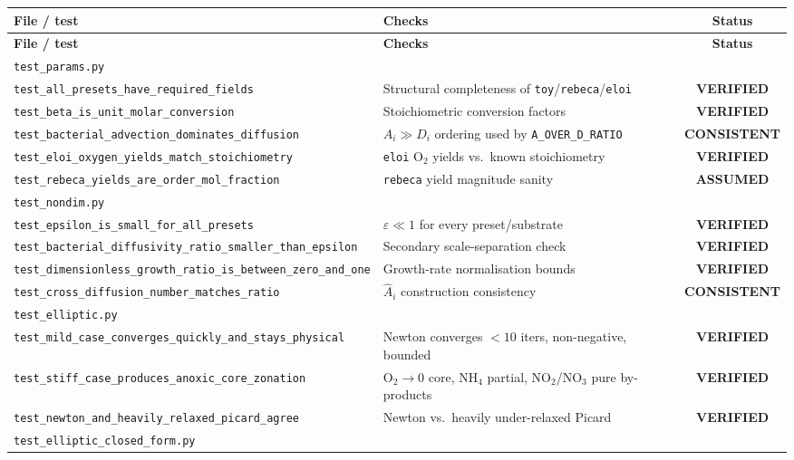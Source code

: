 \documentclass[11pt]{article}
\newcommand{\verified}{\textcolor{green!45!black}{\textbf{VERIFIED}}}
\newcommand{\consistent}{\textcolor{blue!55!black}{\textbf{CONSISTENT}}}
\newcommand{\assumed}{\textcolor{orange!70!black}{\textbf{ASSUMED}}}
\newcommand{\code}[1]{\texttt{#1}}
\newcommand{\test}[1]{\texttt{\small #1}}
\begin{document}
\begin{longtable}{p{3.6cm}p{9.4cm}c}
\toprule
\textbf{File / test} & \textbf{Checks} & \textbf{Status}\\
\midrule
\endfirsthead
\toprule
\textbf{File / test} & \textbf{Checks} & \textbf{Status}\\
\midrule
\endhead
\multicolumn{3}{l}{\code{test\_params.py}} \\
\test{test\_all\_presets\_have\_required\_fields} & Structural completeness of \code{toy}/\code{rebeca}/\code{eloi} & \verified \\
\test{test\_beta\_is\_unit\_molar\_conversion} & Stoichiometric conversion factors & \verified \\
\test{test\_bacterial\_advection\_dominates\_diffusion} & $A_i \gg D_i$ ordering used by \code{A\_OVER\_D\_RATIO} & \consistent \\
\test{test\_eloi\_oxygen\_yields\_match\_stoichiometry} & \code{eloi} O$_2$ yields vs.\ known stoichiometry & \verified \\
\test{test\_rebeca\_yields\_are\_order\_mol\_fraction} & \code{rebeca} yield magnitude sanity & \assumed \\
\midrule
\multicolumn{3}{l}{\code{test\_nondim.py}} \\
\test{test\_epsilon\_is\_small\_for\_all\_presets} & $\varepsilon\ll1$ for every preset/substrate & \verified \\
\test{test\_bacterial\_diffusivity\_ratio\_smaller\_than\_epsilon} & Secondary scale-separation check & \verified \\
\test{test\_dimensionless\_growth\_ratio\_is\_between\_zero\_and\_one} & Growth-rate normalisation bounds & \verified \\
\test{test\_cross\_diffusion\_number\_matches\_ratio} & $\hat A_i$ construction consistency & \consistent \\
\midrule
\multicolumn{3}{l}{\code{test\_elliptic.py}} \\
\test{test\_mild\_case\_converges\_quickly\_and\_stays\_physical} & Newton converges $<10$ iters, non-negative, bounded & \verified \\
\test{test\_stiff\_case\_produces\_anoxic\_core\_zonation} & O$_2\to0$ core, NH$_4$ partial, NO$_2$/NO$_3$ pure by-products & \verified \\
\test{test\_newton\_and\_heavily\_relaxed\_picard\_agree} & Newton vs.\ heavily under-relaxed Picard & \verified \\
\midrule
\multicolumn{3}{l}{\code{test\_elliptic\_closed\_form.py}} \\

\end{longtable}
\end{document}
